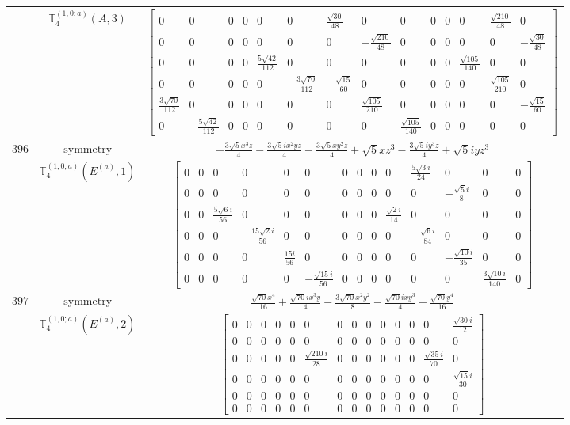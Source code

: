 \documentclass[fleqn,8pt,landscape]{jsarticle}
\begin{document}
\begin{longtable}{ccc}
$  $ & $ \mathbb{T}_{4}^{(1,0;a)}(A,3) $ & $ \begin{bmatrix} 0 & 0 & 0 & 0 & 0 & 0 & \frac{\sqrt{30}}{48} & 0 & 0 & 0 & 0 & 0 & \frac{\sqrt{210}}{48} & 0 \\ 0 & 0 & 0 & 0 & 0 & 0 & 0 & - \frac{\sqrt{210}}{48} & 0 & 0 & 0 & 0 & 0 & - \frac{\sqrt{30}}{48} \\ 0 & 0 & 0 & 0 & \frac{5 \sqrt{42}}{112} & 0 & 0 & 0 & 0 & 0 & 0 & \frac{\sqrt{105}}{140} & 0 & 0 \\ 0 & 0 & 0 & 0 & 0 & - \frac{3 \sqrt{70}}{112} & - \frac{\sqrt{15}}{60} & 0 & 0 & 0 & 0 & 0 & \frac{\sqrt{105}}{210} & 0 \\ \frac{3 \sqrt{70}}{112} & 0 & 0 & 0 & 0 & 0 & 0 & \frac{\sqrt{105}}{210} & 0 & 0 & 0 & 0 & 0 & - \frac{\sqrt{15}}{60} \\ 0 & - \frac{5 \sqrt{42}}{112} & 0 & 0 & 0 & 0 & 0 & 0 & \frac{\sqrt{105}}{140} & 0 & 0 & 0 & 0 & 0 \end{bmatrix} $ \\ \hline
$ 396 $ & $ \text{symmetry} $ & $ - \frac{3 \sqrt{5} x^{3} z}{4} - \frac{3 \sqrt{5} i x^{2} y z}{4} - \frac{3 \sqrt{5} x y^{2} z}{4} + \sqrt{5} x z^{3} - \frac{3 \sqrt{5} i y^{3} z}{4} + \sqrt{5} i y z^{3} $ \\
$  $ & $ \mathbb{T}_{4}^{(1,0;a)}(E^{(a)},1) $ & $ \begin{bmatrix} 0 & 0 & 0 & 0 & 0 & 0 & 0 & 0 & 0 & 0 & \frac{5 \sqrt{3} i}{24} & 0 & 0 & 0 \\ 0 & 0 & 0 & 0 & 0 & 0 & 0 & 0 & 0 & 0 & 0 & - \frac{\sqrt{5} i}{8} & 0 & 0 \\ 0 & 0 & \frac{5 \sqrt{6} i}{56} & 0 & 0 & 0 & 0 & 0 & 0 & \frac{\sqrt{2} i}{14} & 0 & 0 & 0 & 0 \\ 0 & 0 & 0 & - \frac{15 \sqrt{2} i}{56} & 0 & 0 & 0 & 0 & 0 & 0 & - \frac{\sqrt{6} i}{84} & 0 & 0 & 0 \\ 0 & 0 & 0 & 0 & \frac{15 i}{56} & 0 & 0 & 0 & 0 & 0 & 0 & - \frac{\sqrt{10} i}{35} & 0 & 0 \\ 0 & 0 & 0 & 0 & 0 & - \frac{\sqrt{15} i}{56} & 0 & 0 & 0 & 0 & 0 & 0 & \frac{3 \sqrt{10} i}{140} & 0 \end{bmatrix} $ \\ \hline
$ 397 $ & $ \text{symmetry} $ & $ \frac{\sqrt{70} x^{4}}{16} + \frac{\sqrt{70} i x^{3} y}{4} - \frac{3 \sqrt{70} x^{2} y^{2}}{8} - \frac{\sqrt{70} i x y^{3}}{4} + \frac{\sqrt{70} y^{4}}{16} $ \\
$  $ & $ \mathbb{T}_{4}^{(1,0;a)}(E^{(a)},2) $ & $ \begin{bmatrix} 0 & 0 & 0 & 0 & 0 & 0 & 0 & 0 & 0 & 0 & 0 & 0 & 0 & \frac{\sqrt{30} i}{12} \\ 0 & 0 & 0 & 0 & 0 & 0 & 0 & 0 & 0 & 0 & 0 & 0 & 0 & 0 \\ 0 & 0 & 0 & 0 & 0 & \frac{\sqrt{210} i}{28} & 0 & 0 & 0 & 0 & 0 & 0 & \frac{\sqrt{35} i}{70} & 0 \\ 0 & 0 & 0 & 0 & 0 & 0 & 0 & 0 & 0 & 0 & 0 & 0 & 0 & \frac{\sqrt{15} i}{30} \\ 0 & 0 & 0 & 0 & 0 & 0 & 0 & 0 & 0 & 0 & 0 & 0 & 0 & 0 \\ 0 & 0 & 0 & 0 & 0 & 0 & 0 & 0 & 0 & 0 & 0 & 0 & 0 & 0 \end{bmatrix} $ \\ \hline

\end{longtable}
\end{document}
